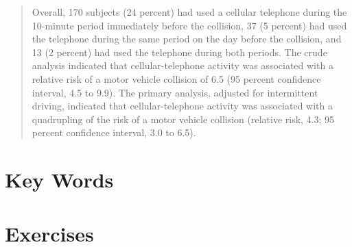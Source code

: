 \documentclass[11pt, chapterprefix=true]{scrbook}\usepackage[]{graphicx}\usepackage[]{color}
\begin{document}
\begin{quotation}
Overall, 170 subjects (24 percent) had used a cellular telephone during the 10-minute period immediately before the collision, 37 (5 percent) had used the telephone during the same period on the day before the collision, and 13 (2 percent) had used the telephone during both periods. The crude analysis indicated that cellular-telephone activity was associated with a relative risk of a motor vehicle collision of 6.5 (95 percent confidence interval, 4.5 to 9.9).  The primary analysis, adjusted for intermittent driving, indicated that cellular-telephone activity was associated with a quadrupling of the risk of a motor vehicle collision (relative risk, 4.3; 95 percent confidence interval, 3.0 to 6.5).
\end{quotation}










\section{Key Words}


\twocolumn
\section{Exercises}
\end{document}
